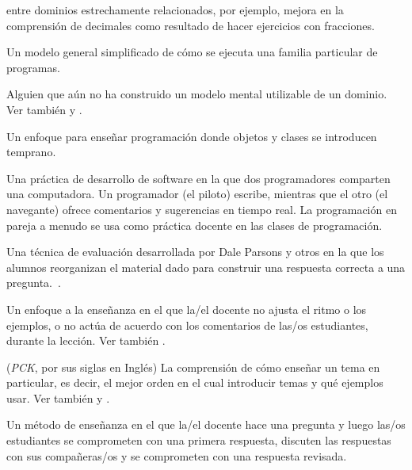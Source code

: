 \begin{description}
  entre dominios estrechamente relacionados, por ejemplo, mejora en la comprensión de decimales como resultado de hacer ejercicios con fracciones.

 Un modelo general simplificado de cómo se ejecuta una familia particular de programas.

 Alguien que aún no ha construido un modelo mental utilizable de un dominio. Ver también  y .

 Un enfoque para enseñar programación donde 
objetos y clases se introducen temprano.

 Una práctica de desarrollo de software en la que dos programadores comparten una computadora. Un programador (el piloto) escribe, mientras que el otro (el navegante) ofrece comentarios y sugerencias en tiempo real. La programación en pareja a menudo se usa como práctica docente en las clases de programación.


 Una técnica de evaluación desarrollada 
por Dale Parsons y otros en la que los alumnos reorganizan el material dado 
para construir una respuesta correcta a una pregunta.~\cite{Pars2006}.



 Un enfoque a la enseñanza en el que la/el docente no ajusta el ritmo o los ejemplos, o no actúa de acuerdo con los comentarios de las/os estudiantes, durante la lección.  Ver también .

 (\emph{PCK}, por sus siglas en Inglés) La comprensión de cómo enseñar un tema en particular, es decir, el mejor orden en el cual introducir temas y qué ejemplos usar. Ver también
y .

 Un método de enseñanza en el que la/el docente hace una pregunta y luego las/os estudiantes se comprometen con una primera respuesta, discuten las respuestas con sus compañeras/os y se comprometen con una respuesta revisada.


\end{description}
